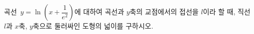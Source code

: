 곡선~$y=\ln\left(x+\dfrac{1}{e^2}\right)$에 대하여 곡선과 $y$축의 교점에서의 접선을 $l$이라 할 때, 직선~$l$과 $x$축, $y$축으로 둘러싸인 도형의 넓이를 구하시오.
